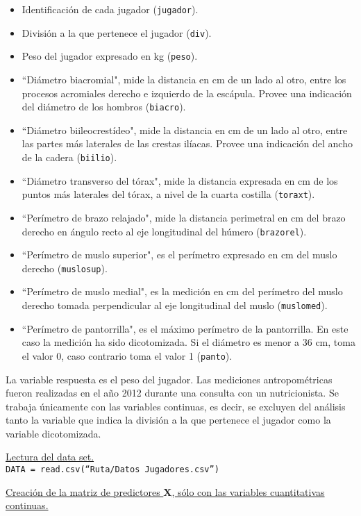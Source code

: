 \documentclass[a4paper,12pt]{report}
\begin{document}
\begin{itemize}
\item Identificación de cada jugador (\texttt{jugador}).
\item División a la que pertenece el jugador (\texttt{div}).
\item Peso del jugador expresado en kg (\texttt{peso}).
\item ``Diámetro biacromial", mide la distancia en cm de un lado al otro, entre los procesos acromiales derecho e izquierdo de la escápula. Provee una indicación del diámetro de los hombros (\texttt{biacro}).
\item ``Diámetro biileocrestídeo", mide la distancia en cm de un lado al otro, entre las partes más laterales de las crestas ilíacas. Provee una indicación del ancho de la cadera (\texttt{biilio}).
\item ``Diámetro transverso del tórax", mide la distancia expresada en cm de los puntos más laterales del tórax, a nivel de la cuarta costilla (\texttt{toraxt}).
\item ``Perímetro de brazo relajado", mide la distancia perimetral en cm del brazo derecho en ángulo recto al eje longitudinal del húmero (\texttt{brazorel}).
\item ``Perímetro de muslo superior", es el perímetro expresado en cm del muslo derecho (\texttt{muslosup}).
\item ``Perímetro de muslo medial", es la medición en cm del perímetro del muslo derecho tomada perpendicular al eje longitudinal del muslo (\texttt{muslomed}).
\item ``Perímetro de pantorrilla", es el máximo perímetro de la pantorrilla. En este caso la medición ha sido dicotomizada. Si el diámetro es menor a 36 cm, toma el valor 0, caso contrario toma el valor 1 (\texttt{panto}).
\end{itemize}

La variable respuesta es el peso del jugador. Las mediciones antropométricas fueron realizadas en el año 2012 durante una consulta con un nutricionista. Se trabaja únicamente con las variables continuas, es decir, se excluyen del análisis tanto la variable que indica la división a la que pertenece el jugador como la variable dicotomizada.

\underline{Lectura del data set.} \\
\texttt{DATA = read.csv(``Ruta/Datos Jugadores.csv'')}

\underline{Creación de la matriz de predictores $\boldsymbol{X}$, sólo con las variables cuantitativas continuas.}
\end{document}
